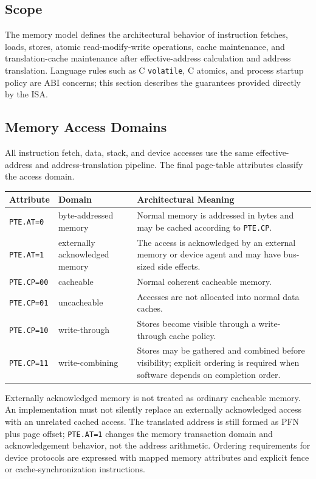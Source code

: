 \subsection{Scope}
The memory model defines the architectural behavior of instruction fetches, loads,
stores, atomic read-modify-write operations, cache maintenance, and translation-cache
maintenance after effective-address calculation and address translation. Language
rules such as C \texttt{volatile}, C atomics, and process startup policy are ABI
concerns; this section describes the guarantees provided directly by the ISA.

\subsection{Memory Access Domains}
All instruction fetch, data, stack, and device accesses use the same effective-address
and address-translation pipeline. The final page-table attributes classify the access
domain.

\begingroup\footnotesize
\begin{longtable}{@{}p{1.25in}p{1.55in}p{2.7in}@{}}
\toprule
\textbf{Attribute} & \textbf{Domain} & \textbf{Architectural Meaning}\\
\midrule
\endhead
\texttt{PTE.AT=0} & byte-addressed memory & Normal memory is addressed in bytes and may be cached according to \texttt{PTE.CP}.\\
\texttt{PTE.AT=1} & externally acknowledged memory & The access is acknowledged by an external memory or device agent and may have bus-sized side effects.\\
\texttt{PTE.CP=00} & cacheable & Normal coherent cacheable memory.\\
\texttt{PTE.CP=01} & uncacheable & Accesses are not allocated into normal data caches.\\
\texttt{PTE.CP=10} & write-through & Stores become visible through a write-through cache policy.\\
\texttt{PTE.CP=11} & write-combining & Stores may be gathered and combined before visibility; explicit ordering is required when software depends on completion order.\\
\bottomrule
\end{longtable}
\endgroup

Externally acknowledged memory is not treated as ordinary cacheable memory. An implementation
must not silently replace an externally acknowledged access with an unrelated cached access.
The translated address is still formed as PFN plus page offset; \texttt{PTE.AT=1}
changes the memory transaction domain and acknowledgement behavior, not the address
arithmetic. Ordering requirements for device protocols are expressed with mapped memory
attributes and explicit fence or cache-synchronization instructions.

